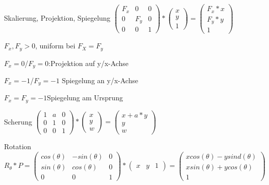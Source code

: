 \documentclass[landscape]{article}
\begin{document}
\begin{multicols}{3}
  \begin{description*}
    \item[Skalierung, Projektion, Spiegelung] $\begin{pmatrix} F_x & 0 & 0 \\ 0 & F_y & 0 \\ 0 & 0 & 1 \end{pmatrix} * \begin{pmatrix} x \\ y \\ 1 \end{pmatrix} = \begin{pmatrix} F_x*x \\ F_y*y \\ 1 \end{pmatrix}$
          
          $F_x,F_y>0$, uniform bei $F_X=F_y$
          
          $F_x=0$/$F_y=0$:Projektion auf y/x-Achse 
          
          $F_x=-1$/$F_y=-1$ Spiegelung an y/x-Achse
          
          $F_x=F_y=-1$Spiegelung am Ursprung
          
    \item[Scherung] $\begin{pmatrix} 1 & a & 0 \\ 0 & 1 & 0 \\ 0 & 0 & 1 \end{pmatrix} * \begin{pmatrix} x \\ y \\ w \end{pmatrix} = \begin{pmatrix} x+a*y \\ y \\ w \end{pmatrix}$
    \item[Rotation] $R_\theta *P= \begin{pmatrix}cos(\theta) & -sin(\theta) & 0 \\ sin(\theta) & cos(\theta) & 0 \\ 0 & 0 & 1 \end{pmatrix} * \begin{pmatrix}x & y & 1 \end{pmatrix} = \begin{pmatrix} x cos(\theta) - y sind(\theta)\\ x sin(\theta)+y cos(\theta)\\ 1 \end{pmatrix}$
  \end{description*}
  

\end{multicols}
\end{document}

